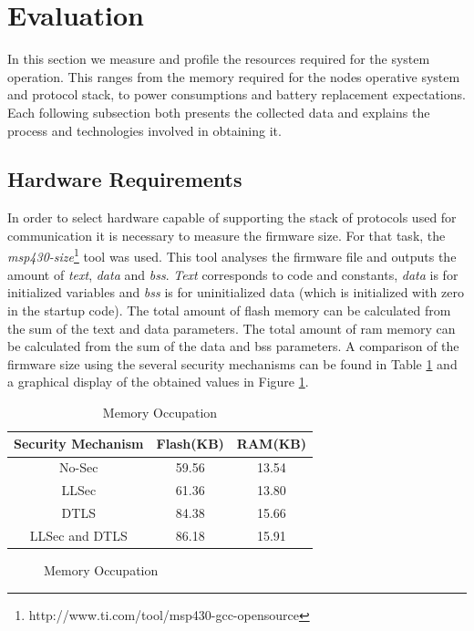 \documentclass{sig-alternate-05-2015}
\newcommand{\legend}[2][]{
    \begin{scope}[#1]
    \path
        \foreach \n/\s in {#2}
            {
                  ++(0,-10pt) node[\s,legend box] {} +(5pt,0) node[legend label] {\n}
            }
    ;
    \end{scope}
}
\begin{document}
\section{Evaluation}
In this section we measure and profile the resources required for the system operation. This ranges from the memory required for the nodes operative system and protocol stack, to power consumptions and battery replacement expectations. Each following subsection both presents the collected data and explains the process and technologies involved in obtaining it.

\subsection{Hardware Requirements}
In order to select hardware capable of supporting the stack of protocols used for communication it is necessary to measure the firmware size. For that task, the \textit{msp430-size}\footnote{http://www.ti.com/tool/msp430-gcc-opensource} tool was used. This tool analyses the firmware file and outputs the amount of \textit{text}, \textit{data} and \textit{bss}.
\textit{Text} corresponds to code and constants, \textit{data} is for initialized variables and \textit{bss} is for uninitialized data (which is initialized with zero in the startup code).
The total amount of flash memory can be calculated from the sum of the text and data parameters.
The total amount of ram memory can be calculated from the sum of the data and bss parameters.
A comparison of the firmware size using the several security mechanisms can be found in Table \ref{tab:space_req} and a graphical display of the obtained values in Figure \ref{fig:space_req}.

\begin{table}
\centering
\caption{Memory Occupation}
\label{tab:space_req}
\begin{tabular}{|c|c|c|} \hline
Security Mechanism&Flash(KB)&RAM(KB)\\ \hline
No-Sec& 59.56& 13.54\\ \hline
LLSec& 61.36& 13.80\\ \hline
DTLS& 84.38 & 15.66\\ \hline
LLSec and DTLS& 86.18& 15.91\\
\hline\end{tabular}
\end{table}

\begin{figure}
\centering
{}
\caption{Memory Occupation} \label{fig:space_req}
\end{figure}
\end{document}
